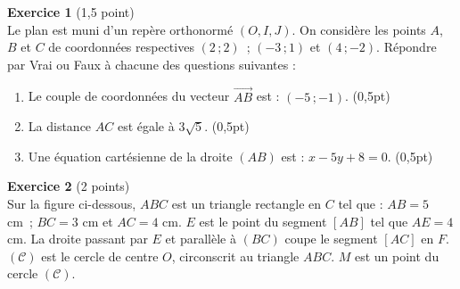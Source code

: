 \textbf{Exercice 1} (1,5 point) \\
Le plan est muni d'un repère orthonormé $(O,I,J)$. On considère les points $A$, $B$ et $C$
de coordonnées respectives $(2\,;2)$~; $(-3\,;1)$ et $(4\,;-2)$. Répondre par Vrai ou Faux à
chacune des questions suivantes :
\begin{enumerate}[label=\arabic*)]
\item Le couple de coordonnées du vecteur $\overrightarrow{AB}$ est : $(-5\,;-1)$. \hfill
(0,5pt)
\item La distance $AC$ est égale à $3\sqrt5$. \hfill (0,5pt)
\item Une équation cartésienne de la droite $(AB)$ est : $x-5y+8=0$. \hfill (0,5pt)
\end{enumerate}

\textbf{Exercice 2} (2 points) \\
Sur la figure ci-dessous, $ABC$ est un triangle rectangle en $C$ tel que : $AB=5$ cm~;
$BC=3$ cm et $AC=4$ cm. $E$ est le point du segment $[AB]$ tel que $AE=4$ cm. La droite
passant par $E$ et parallèle à $(BC)$ coupe le segment $[AC]$ en $F$. $(\mathcal C)$ est le
cercle de centre $O$, circonscrit au triangle $ABC$. $M$ est un point du cercle
$(\mathcal C)$.

\begin{illus}
\end{illus}


